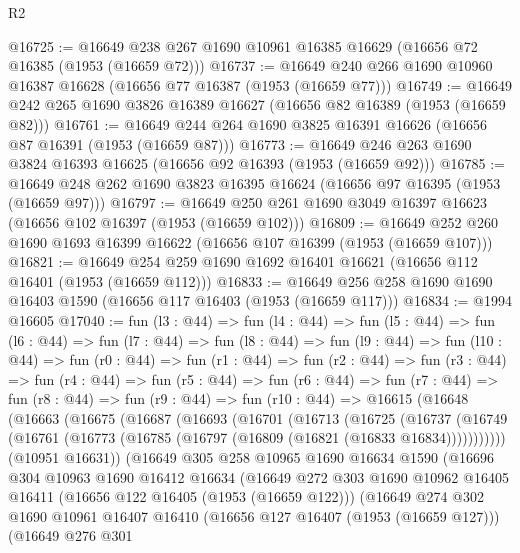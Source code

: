 \begin{lexlean}{R2}
\begin{coremodule}
@16725 := @16649 @238 @267 @1690 @10961 @16385 @16629 (@16656 @72 @16385 (@1953 (@16659 @72)))
@16737 := @16649 @240 @266 @1690 @10960 @16387 @16628 (@16656 @77 @16387 (@1953 (@16659 @77)))
@16749 := @16649 @242 @265 @1690 @3826 @16389 @16627 (@16656 @82 @16389 (@1953 (@16659 @82)))
@16761 := @16649 @244 @264 @1690 @3825 @16391 @16626 (@16656 @87 @16391 (@1953 (@16659 @87)))
@16773 := @16649 @246 @263 @1690 @3824 @16393 @16625 (@16656 @92 @16393 (@1953 (@16659 @92)))
@16785 := @16649 @248 @262 @1690 @3823 @16395 @16624 (@16656 @97 @16395 (@1953 (@16659 @97)))
@16797 := @16649 @250 @261 @1690 @3049 @16397 @16623 (@16656 @102 @16397 (@1953 (@16659 @102)))
@16809 := @16649 @252 @260 @1690 @1693 @16399 @16622 (@16656 @107 @16399 (@1953 (@16659 @107)))
@16821 := @16649 @254 @259 @1690 @1692 @16401 @16621 (@16656 @112 @16401 (@1953 (@16659 @112)))
@16833 := @16649 @256 @258 @1690 @1690 @16403 @1590 (@16656 @117 @16403 (@1953 (@16659 @117)))
@16834 := @1994 @16605
@17040 := fun (l3 : @44) =>
  fun (l4 : @44) =>
  fun (l5 : @44) =>
  fun (l6 : @44) =>
  fun (l7 : @44) =>
  fun (l8 : @44) =>
  fun (l9 : @44) =>
  fun (l10 : @44) =>
  fun (r0 : @44) =>
  fun (r1 : @44) =>
  fun (r2 : @44) =>
  fun (r3 : @44) =>
  fun (r4 : @44) =>
  fun (r5 : @44) =>
  fun (r6 : @44) =>
  fun (r7 : @44) =>
  fun (r8 : @44) =>
  fun (r9 : @44) =>
  fun (r10 : @44) =>
  @16615
    (@16648
      (@16663
        (@16675
          (@16687
            (@16693
              (@16701
                (@16713
                  (@16725
                    (@16737
                      (@16749
                        (@16761 (@16773 (@16785 (@16797 (@16809 (@16821 (@16833 @16834)))))))))))
                (@10951 @16631))
              (@16649
                @305
                @258
                @10965
                @1690
                @16634
                @1590
                (@16696
                  @304
                  @10963
                  @1690
                  @16412
                  @16634
                  (@16649
                    @272
                    @303
                    @1690
                    @10962
                    @16405
                    @16411
                    (@16656 @122 @16405 (@1953 (@16659 @122)))
                    (@16649
                      @274
                      @302
                      @1690
                      @10961
                      @16407
                      @16410
                      (@16656 @127 @16407 (@1953 (@16659 @127)))
                      (@16649
                        @276
                        @301

\end{coremodule}
\end{lexlean}

